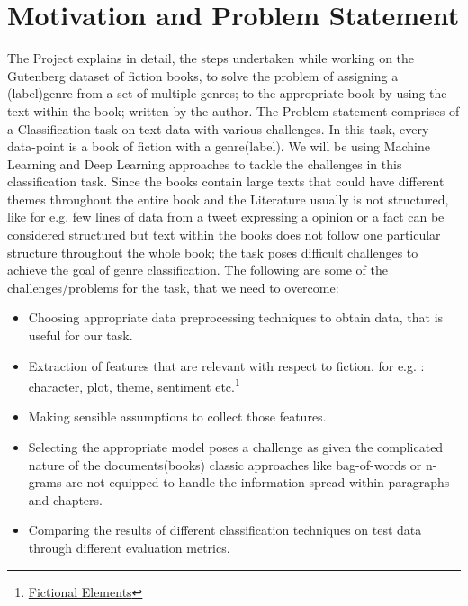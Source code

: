 \documentclass[conference]{IEEEtran}
\begin{document}
\section{Motivation and Problem Statement}\vspace{1mm}
\justify
The Project explains in detail, the steps undertaken while working on the Gutenberg dataset of fiction books, to solve the problem of assigning a (label)genre from a set of multiple genres; to the appropriate book by using the text within the book; written by the author. The Problem statement comprises of a Classification task on text data with various challenges. In this task, every data-point is a book of fiction with a genre(label). We will be using Machine Learning and Deep Learning approaches to tackle the challenges in this classification task. Since the books contain large texts that could have different themes throughout the entire book and the Literature usually is not structured, like for e.g. few lines of data from a tweet\cite{Garg2014,Pak2010} expressing a opinion or a fact can be considered structured but text within the books does not follow one particular structure throughout the whole book; the task poses difficult challenges to achieve the goal of genre classification. The following are some of the challenges/problems for the task, that we need to overcome:\vspace{1mm}
\begin{itemize}
  \item Choosing appropriate data preprocessing techniques to obtain data, that is useful for our task.\vspace{1mm}
  \item Extraction of features that are relevant with respect to fiction. for e.g. : character, plot, theme, sentiment etc.\footnote[2]{\href{https://web.csulb.edu/~yamadaty/EleFic.html}{Fictional Elements}}\vspace{1mm}
  \item Making sensible assumptions to collect those features.\vspace{1mm}
  \item Selecting the appropriate model poses a challenge as given the complicated nature of the documents(books) classic approaches like bag-of-words or n-grams are not equipped to handle the information spread within paragraphs and chapters.\vspace{1mm}
  \item Comparing the results of different classification techniques on test data through different evaluation metrics.
\end{itemize}
\end{document}
